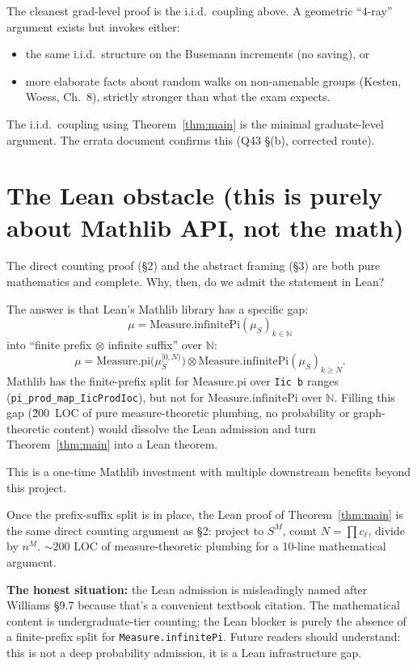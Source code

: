 \documentclass[11pt,a4paper]{article}
\newcommand{\N}{\mathbb{N}}
\theoremstyle{plain}
\theoremstyle{definition}
\theoremstyle{remark}
\begin{document}
The cleanest grad-level proof is the i.i.d.\ coupling above. A
geometric ``$4$-ray'' argument exists but invokes either:
\begin{itemize}
  \item the same i.i.d.\ structure on the Busemann increments
    (no saving), or
  \item more elaborate facts about random walks on non-amenable groups
    (Kesten, Woess, Ch.~8), strictly stronger than what the exam
    expects.
\end{itemize}
The i.i.d.\ coupling using Theorem~\ref{thm:main} is the minimal
graduate-level argument. The errata document confirms this (Q43
\S(b), corrected route).

\section{The Lean obstacle (this is purely about Mathlib API, not the math)}

The direct counting proof (\S 2) and the abstract framing (\S 3) are
both pure mathematics and complete. Why, then, do we admit the
statement in Lean?

The answer is that Lean's Mathlib library has a specific gap:
\[
  \mu = \mathrm{Measure.infinitePi}(\mu_S)_{k \in \N}
\]
into ``finite prefix $\otimes$ infinite suffix'' over $\N$:
\[
  \mu = \mathrm{Measure.pi}\bigl(\mu_S^{[0,N)}\bigr)
    \otimes \mathrm{Measure.infinitePi}(\mu_S)_{k \geq N}.
\]
Mathlib has the finite-prefix split for $\mathrm{Measure.pi}$ over
\verb|Iic b| ranges (\verb|pi_prod_map_IicProdIoc|), but not for
$\mathrm{Measure.infinitePi}$ over $\N$. Filling this gap (\~200~LOC
of pure measure-theoretic plumbing, no probability or
graph-theoretic content) would dissolve the Lean admission and turn
Theorem~\ref{thm:main} into a Lean theorem.

This is a one-time Mathlib investment with multiple downstream
benefits beyond this project.

Once the prefix-suffix split is in place, the Lean proof of
Theorem~\ref{thm:main} is the same direct counting argument as
\S 2: project to $S^M$, count $N = \prod c_\ell$, divide by $n^M$.
$\sim 200$ LOC of measure-theoretic plumbing for a 10-line
mathematical argument.

\textbf{The honest situation:} the Lean admission is misleadingly
named after Williams \S 9.7 because that's a convenient textbook
citation. The mathematical content is undergraduate-tier counting;
the Lean blocker is purely the absence of a finite-prefix split for
\verb|Measure.infinitePi|. Future readers should understand: this is
not a deep probability admission, it is a Lean infrastructure gap.
\end{document}
